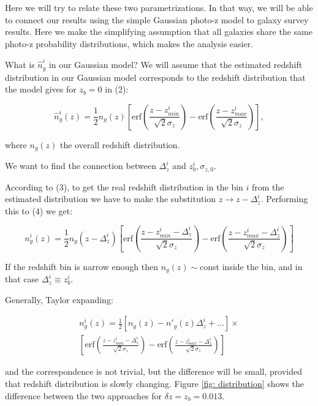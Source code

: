 \documentclass[a4paper,fleqn,usenatbib]{mnras}
\begin{document}
Here we will try to relate these two parametrizations. In that way, we will be able to connect our results using the simple Gaussian photo-z model to galaxy survey results. Here we make the simplifying assumption that all galaxies share the same photo-z probability distributions, which makes the analysis easier.


What is $\hat{n}^i_g$ in our Gaussian model? We will assume that the estimated redshift distribution in our Gaussian model corresponds to the redshift distribution that the model gives for $z_b = 0$ in (2):

\begin{equation}
\hat{n}_g^i(z) = \frac{1}{2}n_g(z)\left[\mbox{erf}\left(\frac{z - z_{min}^i}{\sqrt{2}\sigma_z}\right) - \mbox{erf}\left(\frac{z - z_{max}^i}{\sqrt{2}\sigma_z}\right) \right],
\end{equation}

where $n_g(z)$ the overall redshift distribution.


We want to find the connection between $\Delta_z^i$ and $z_b^i, \sigma_{z,0}$.

According to (3), to get the real redshift distribution in the bin $i$ from the estimated distribution we have to make the substitution $z \to z - \Delta_z^i$. Performing this to (4) we get:

\begin{equation}
n_g^i(z) = \frac{1}{2}n_g(z- \Delta_z^i)\left[\mbox{erf}\left(\frac{z - z_{min}^i - \Delta_z^i}{\sqrt{2}\sigma_z}\right) - \mbox{erf}\left(\frac{z - z_{max}^i - \Delta_z^i}{\sqrt{2}\sigma_z}\right) \right]
\end{equation}

If the redshift bin is narrow enough then $n_g(z) \sim$const inside the bin, and in that case $\Delta_z^i \equiv z_b^i$. 

Generally, Taylor expanding:

\begin{align}
n_g^i(z) = \frac{1}{2}\left[n_g(z) - n'_g(z)\Delta_z^i + \dots\right] \times \nonumber \\
\left[\mbox{erf}\left(\frac{z - z_{min}^i - \Delta_z^i}{\sqrt{2}\sigma_z}\right) - \mbox{erf}\left(\frac{z - z_{max}^i - \Delta_z^i}{\sqrt{2}\sigma_z}\right) \right]
\end{align}

and the correspondence is not trivial, but the difference will be small, provided that redshift distribution is slowly changing. Figure \ref{fig: distribution} shows the difference between the two approaches for $\delta z = z_b = 0.013$.
\end{document}
